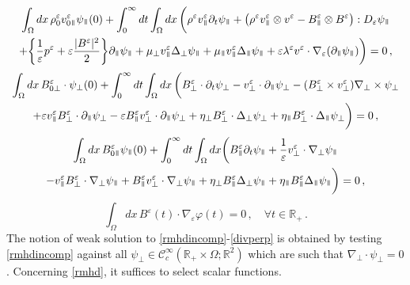 \documentclass[11pt,reqno]{amsart}
\def \R{{\mathbb{R}}}
\newcommand{\myparallel}{{\mkern3mu\vphantom{\perp}\vrule depth 0pt\mkern2mu\vrule depth 0pt\mkern3mu}}
\begin{document}
\begin{multline}
\label{eq:vparal-eps}
 \int_\Omega dx \,\rho_0^\varepsilon v_{0 \myparallel}^\varepsilon \psi_\myparallel(0)
+ \int_0^\infty dt \int_\Omega dx\,  \bigg( \rho^\varepsilon v_{\myparallel }^\varepsilon \partial_t \psi_\myparallel
+ \big( \rho^\varepsilon v_{\myparallel }^\varepsilon \otimes  v^\varepsilon
- B_{\myparallel }^\varepsilon \otimes  B^\varepsilon \big) : D_\varepsilon \psi_\myparallel 
\\ 
+ \bigg\{ \frac{1}{\varepsilon}p^\varepsilon  + \varepsilon\frac{|B^\varepsilon|^2}{2}\bigg\} \partial_\myparallel  \psi_\myparallel
+ \mu_\perp v_{\myparallel }^\varepsilon  \Delta_\perp \psi_\myparallel + \mu_\myparallel v_{\myparallel }^\varepsilon \Delta_\myparallel \psi_\myparallel
+ \varepsilon \lambda^\varepsilon v^\varepsilon \cdot \nabla_\varepsilon (\partial_\myparallel \psi_\myparallel)  
\bigg) =0 \,,
\end{multline}    
\begin{multline}
\label{eq:Bperp-eps}
 \int_\Omega dx \,B_{0\perp}^\varepsilon \cdot \psi_\perp(0)
+ \int_0^\infty dt \int_\Omega dx\,  \bigg(  B_{\perp }^\varepsilon \cdot \partial_t \psi_\perp
- v_{\perp }^\varepsilon \cdot \partial_\myparallel \psi_\perp - (B_\perp^\varepsilon \times v_\perp^\varepsilon) \nabla_\perp \times \psi_\perp
\\ 
+ \varepsilon v_\myparallel^\varepsilon B_\perp^\varepsilon \cdot \partial_\myparallel \psi_\perp - \varepsilon B_\myparallel^\varepsilon v_\perp^\varepsilon \cdot \partial_\myparallel \psi_\perp
+ \eta_\perp B_{\perp }^\varepsilon \cdot \Delta_\perp \psi_\perp + \eta_\myparallel B_{\perp }^\varepsilon \cdot \Delta_\myparallel \psi_\perp 
\bigg) =0 \,,
\end{multline}
\begin{multline}
\label{eq:Bparal-eps}
 \int_\Omega dx \,  B_{0 \myparallel}^\varepsilon \psi_\myparallel(0)
+ \int_0^\infty dt \int_\Omega dx \bigg( B_{\myparallel }^\varepsilon \partial_t \psi_\myparallel
+ \frac{1}{\varepsilon} v_\perp^\varepsilon \cdot \nabla_\perp \psi_\myparallel 
\\ 
-v_\myparallel^\varepsilon  B_\perp^\varepsilon \cdot \nabla_\perp \psi_\myparallel + B_\myparallel^\varepsilon v_\perp^\varepsilon \cdot \nabla_\perp \psi_\myparallel
+ \eta_\perp B_{\myparallel }^\varepsilon  \Delta_\perp \psi_\myparallel + \eta_\myparallel B_{\myparallel }^\varepsilon \Delta_\myparallel \psi_\myparallel
\bigg) =0 \,,
\end{multline}
\begin{equation}
\label{eq:zero-divB}
\int_\Omega dx\, B^\varepsilon(t) \cdot \nabla_\varepsilon \varphi (t) = 0\,, \quad \forall t\in \R_+\, .
\end{equation}
The notion of weak solution to \eqref{rmhdincomp}-\eqref{divperp} is obtained by testing \eqref{rmhdincomp} against all $ \psi_\perp \in \mathscr{C}_c^\infty(\R_+\times\Omega;\R^2)$ which are such that $\nabla_\perp \cdot \psi_\perp =0$. Concerning \eqref{rmhd}, it suffices to select scalar functions.
\end{document}
